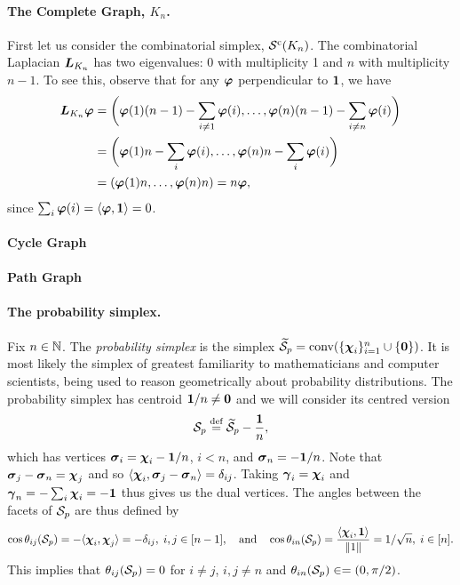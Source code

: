\paragraph{The Complete Graph, $K_n$.}
First let us consider the combinatorial simplex, $\mathcal{S}^{\textnormal{c}}(K_n)$.  The combinatorial Laplacian $\vb*{L}_{K_n}$ has two eigenvalues: 0 with multiplicity 1 and $n$ with multiplicity $n-1$. To see this, observe that for any $\vb*{\varphi}$ perpendicular to $\vb{1}$, we have 
\begin{align*}
\vb*{L}_{K_n}\vb*{\varphi} &= \bigg(\vb*{\varphi}(1)(n-1)-\sum_{i\neq 1}\vb*{\varphi}(i),\dots,\vb*{\varphi}(n)(n-1)-\sum_{i\neq n}\vb*{\varphi}(i)\bigg) \\
&= \bigg(\vb*{\varphi}(1)n - \sum_i \vb*{\varphi}(i), \dots,\vb*{\varphi}(n)n - \sum_i \vb*{\varphi}(i)\bigg) \\
&= (\vb*{\varphi}(1)n,\dots,\vb*{\varphi}(n)n) = n\vb*{\varphi},
\end{align*}
since $\sum_i\vb*{\varphi}(i)=\langle \vb*{\varphi},\vb{1}\rangle =0$. 

\paragraph{Cycle Graph}

\paragraph{Path Graph}

\paragraph{The probability simplex.} 
Fix  $n\in\mathbb{N}$. The \emph{probability simplex} is the simplex $\widetilde{\mathcal{S}}_p=\textnormal{conv}(\{\boldsymbol{\chi}_i\}_{i=1}^n \cup \{\vb{0}\})$. It is most likely the simplex of greatest familiarity to mathematicians and computer scientists, being used to reason geometrically about probability distributions. The probability simplex has centroid $\vb{1}/n\neq\vb{0}$ and we will consider its centred version 
\[\mathcal{S}_p \overset{\text{def}}{=} \widetilde{\mathcal{S}}_p -  \frac{\vb{1}}{n},\]
which has vertices  $\vb*{\sigma}_i = \boldsymbol{\chi}_i - \vb{1}/n$, $i<n$, and $\vb*{\sigma}_n = -\vb{1}/n$. Note that $\vb*{\sigma}_j-\vb*{\sigma}_n = \boldsymbol{\chi}_j$ and so 
$\langle \boldsymbol{\chi}_i, \vb*{\sigma}_j-\vb*{\sigma}_n\rangle = \delta_{ij}$. Taking  $\vb*{\gamma}_i = \boldsymbol{\chi}_i$ and $\vb*{\gamma}_n = -\sum_i \boldsymbol{\chi}_i = -\vb{1}$ thus gives us the dual vertices. The  angles between the facets of $\mathcal{S}_p$ are thus defined by 
\begin{equation*}
\cos\theta_{ij}(\mathcal{S}_p) = - \langle \boldsymbol{\chi}_i,\boldsymbol{\chi}_j\rangle = -\delta_{ij}, \; i,j\in[n-1],  \quad \text{and}\quad \cos\theta_{in}(\mathcal{S}_p) = \frac{\langle \boldsymbol{\chi}_i,\vb{1}\rangle}{\norm{1}} = 1/\sqrt{n}, \;i\in[n].
\end{equation*}
This implies  that $\theta_{ij}(\mathcal{S}_p) = 0$ for $i\neq j$, $i,j\neq n$ and $\theta_{in}(\mathcal{S}_p) \in =(0,\pi/2)$. 

